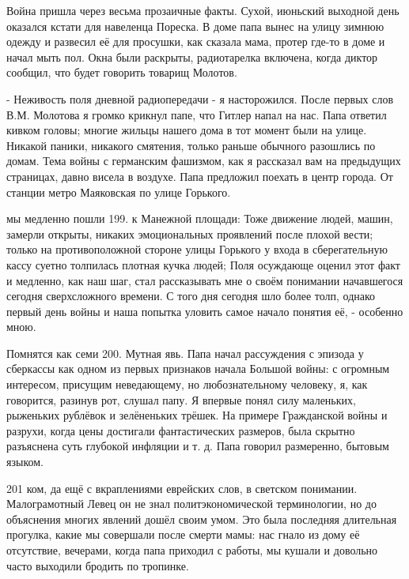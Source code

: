 \label{198-1}
Война пришла через весьма прозаичные факты. Сухой, июньский выходной день оказался кстати для навеленца Пореска. В доме папа вынес на улицу зимнюю одежду и развесил её для просушки, как сказала мама, протер где-то в доме и начал мыть пол. Окна были раскрыты, радиотарелка включена, когда диктор сообщил, что будет говорить товарищ Молотов.

\label{198-2}
- Неживость поля дневной радиопередачи - я насторожился. После первых слов В.М. Молотова я громко крикнул папе, что Гитлер напал на нас. Папа ответил кивком головы; многие жильцы нашего дома в тот момент были на улице. Никакой паники, никакого смятения, только раньше обычного разошлись по домам. Тема войны с германским фашизмом, как я рассказал вам на предыдущих страницах, давно висела в воздухе. Папа предложил поехать в центр города. От станции метро Маяковская по улице Горького.

\label{199-1}
мы медленно пошли 199. к Манежной площади: Тоже движение людей, машин, замерли открыты, никаких эмоциональных проявлений после плохой вести; только на противоположной стороне улицы Горького у входа в сберегательную кассу суетно толпилась плотная кучка людей; Поля осуждающе оценил этот факт и медленно, как наш шаг, стал рассказывать мне о своём понимании начавшегося сегодня сверхсложного времени. С того дня сегодня шло более толп, однако первый день войны и наша попытка уловить самое начало понятия её, - особенно мною.

\label{200-1}
Помнятся как семи 200. Мутная явь. Папа начал рассуждения с эпизода у сберкассы как одном из первых признаков начала Большой войны: с огромным интересом, присущим неведающему, но любознательному человеку, я, как говорится, разинув рот, слушал папу. Я впервые понял силу маленьких, рыженьких рублёвок и зелёненьких трёшек. На примере Гражданской войны и разрухи, когда цены достигали фантастических размеров, была скрытно разъяснена суть глубокой инфляции и т. д. Папа говорил размеренно, бытовым языком.

\label{201-1}
201 ком, да ещё с вкраплениями еврейских слов, в светском понимании. Малограмотный Левец он не знал политэкономической терминологии, но до объяснения многих явлений дошёл своим умом. Это была последняя длительная прогулка, какие мы совершали после смерти мамы: нас гнало из дому её отсутствие, вечерами, когда папа приходил с работы, мы кушали и довольно часто выходили бродить по тропинке.

